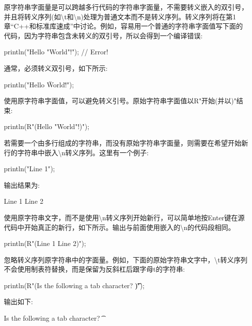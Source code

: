 原字符串字面量是可以跨越多行代码的字符串字面量，不需要转义嵌入的双引号，并且将转义序列(如\textbackslash{}t和\textbackslash{}n)处理为普通文本而不是转义序列。转义序列将在第1章“C++和标准库速成”中讨论。例如，容易用一个普通的字符串字面值写下面的代码，因为字符串包含未转义的双引号，所以会得到一个编译错误:

\begin{cpp}
println("Hello "World"!"); // Error!
\end{cpp}

通常，必须转义双引号，如下所示:

\begin{cpp}
println("Hello \"World\"!");
\end{cpp}

使用原字符串字面值，可以避免转义引号。原始字符串字面值以R"开始(并以)"结束:

\begin{cpp}
println(R"(Hello "World"!)");
\end{cpp}

若需要一个由多行组成的字符串，而没有原始字符串字面量，则需要在希望开始新行的字符串中嵌入\textbackslash{}n转义序列。这里有一个例子:

\begin{cpp}
println("Line 1");
\end{cpp}

输出结果为:

\begin{shell}
Line 1
Line 2
\end{shell}

使用原字符串文字，而不是使用\textbackslash{}n转义序列开始新行，可以简单地按Enter键在源代码中开始真正的新行，如下所示。输出与前面使用嵌入的\textbackslash{}n的代码段相同。

\begin{cpp}
println(R"(Line 1
Line 2)");
\end{cpp}

忽略转义序列原字符串中的字面量。例如，下面的原始字符串文字中，\textbackslash{}t转义序列不会使用制表符替换，而是保留为反斜杠后跟字母t的字符串:

\begin{cpp}
println(R"(Is the following a tab character? \t)");
\end{cpp}

输出如下:

\begin{shell}
Is the following a tab character? \t
\end{shell}

